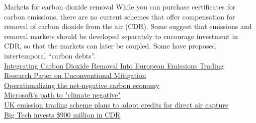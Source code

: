 \documentclass[10pt,aspectratio=169,dvipsnames]{beamer}
\begin{document}
\begin{frame}
  \begin{block}{Markets for carbon dioxide removal}
    While you can purchase certificates for carbon emissions, there are no current schemes that offer compensation for removal of carbon dioxide from the air (CDR). Some suggest that emissions and removal markets should be developed separately to encourage investment in CDR, so that the markets can later be coupled. Some have proposed intertemporal “carbon debts”.\\
    \href{https://www.frontiersin.org/articles/10.3389/fclim.2021.690023/full}{Integrating Carbon Dioxide Removal Into European Emissions Trading}\\
    \href{https://www.swp-berlin.org/publications/products/research_papers/2020RP08_ClimateMitigation.pdf}{Research Paper on Unconventional Mitigation}\\
    \href{https://www.nature.com/articles/s41586-021-03723-9}{Operationalizing the net-negative carbon economy}\\
    \href{https://blogs.microsoft.com/blog/2021/01/28/one-year-later-the-path-to-carbon-negative-a-progress-report-on-our-climate-moonshot/}{Microsoft's path to "climate negative"}\\
    \href{https://www.ft.com/content/69c5e964-a91a-42b8-818d-6a5d9b21b6cd}{UK emission trading scheme plans to adopt credits for direct air capture}\\
    \href{https://www.theatlantic.com/science/archive/2022/04/big-tech-investment-carbon-removal/629545/}{Big Tech invests \$900 million in CDR}
    \end{block}  
\end{frame}
\end{document}
